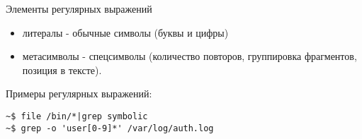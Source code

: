 \begin{frame}[fragile]{Элементы регулярных выражений}
    \begin{itemize}
      \item \alert{литералы} - обычные символы (буквы и цифры) \pause
      \item \alert{метасимволы} - спецсимволы (количество повторов, группировка фрагментов, позиция в тексте).
    \end{itemize} \pause 

    Примеры регулярных выражений:\newline
\begin{lstlisting}[frame=single]
~$ file /bin/*|grep symbolic
~$ grep -o 'user[0-9]*' /var/log/auth.log
\end{lstlisting}
\end{frame}


